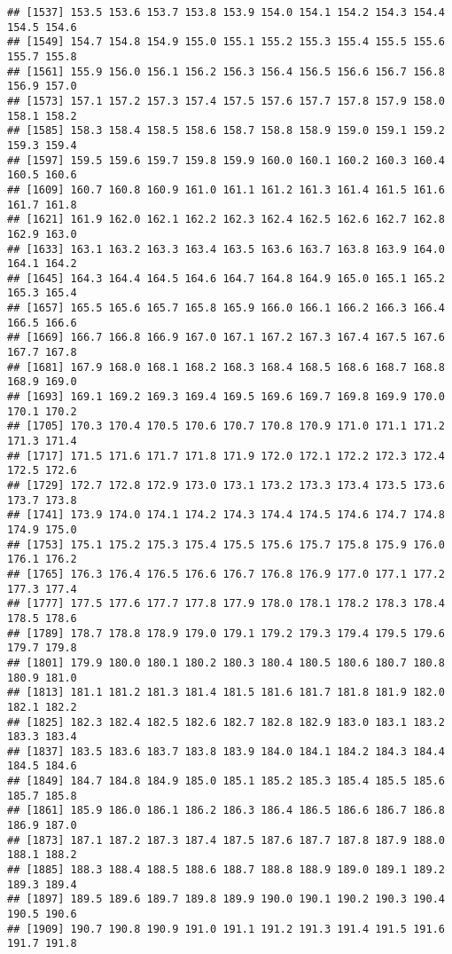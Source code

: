 \documentclass[
]{article}
\begin{document}
\begin{verbatim}
## [1537] 153.5 153.6 153.7 153.8 153.9 154.0 154.1 154.2 154.3 154.4 154.5 154.6
## [1549] 154.7 154.8 154.9 155.0 155.1 155.2 155.3 155.4 155.5 155.6 155.7 155.8
## [1561] 155.9 156.0 156.1 156.2 156.3 156.4 156.5 156.6 156.7 156.8 156.9 157.0
## [1573] 157.1 157.2 157.3 157.4 157.5 157.6 157.7 157.8 157.9 158.0 158.1 158.2
## [1585] 158.3 158.4 158.5 158.6 158.7 158.8 158.9 159.0 159.1 159.2 159.3 159.4
## [1597] 159.5 159.6 159.7 159.8 159.9 160.0 160.1 160.2 160.3 160.4 160.5 160.6
## [1609] 160.7 160.8 160.9 161.0 161.1 161.2 161.3 161.4 161.5 161.6 161.7 161.8
## [1621] 161.9 162.0 162.1 162.2 162.3 162.4 162.5 162.6 162.7 162.8 162.9 163.0
## [1633] 163.1 163.2 163.3 163.4 163.5 163.6 163.7 163.8 163.9 164.0 164.1 164.2
## [1645] 164.3 164.4 164.5 164.6 164.7 164.8 164.9 165.0 165.1 165.2 165.3 165.4
## [1657] 165.5 165.6 165.7 165.8 165.9 166.0 166.1 166.2 166.3 166.4 166.5 166.6
## [1669] 166.7 166.8 166.9 167.0 167.1 167.2 167.3 167.4 167.5 167.6 167.7 167.8
## [1681] 167.9 168.0 168.1 168.2 168.3 168.4 168.5 168.6 168.7 168.8 168.9 169.0
## [1693] 169.1 169.2 169.3 169.4 169.5 169.6 169.7 169.8 169.9 170.0 170.1 170.2
## [1705] 170.3 170.4 170.5 170.6 170.7 170.8 170.9 171.0 171.1 171.2 171.3 171.4
## [1717] 171.5 171.6 171.7 171.8 171.9 172.0 172.1 172.2 172.3 172.4 172.5 172.6
## [1729] 172.7 172.8 172.9 173.0 173.1 173.2 173.3 173.4 173.5 173.6 173.7 173.8
## [1741] 173.9 174.0 174.1 174.2 174.3 174.4 174.5 174.6 174.7 174.8 174.9 175.0
## [1753] 175.1 175.2 175.3 175.4 175.5 175.6 175.7 175.8 175.9 176.0 176.1 176.2
## [1765] 176.3 176.4 176.5 176.6 176.7 176.8 176.9 177.0 177.1 177.2 177.3 177.4
## [1777] 177.5 177.6 177.7 177.8 177.9 178.0 178.1 178.2 178.3 178.4 178.5 178.6
## [1789] 178.7 178.8 178.9 179.0 179.1 179.2 179.3 179.4 179.5 179.6 179.7 179.8
## [1801] 179.9 180.0 180.1 180.2 180.3 180.4 180.5 180.6 180.7 180.8 180.9 181.0
## [1813] 181.1 181.2 181.3 181.4 181.5 181.6 181.7 181.8 181.9 182.0 182.1 182.2
## [1825] 182.3 182.4 182.5 182.6 182.7 182.8 182.9 183.0 183.1 183.2 183.3 183.4
## [1837] 183.5 183.6 183.7 183.8 183.9 184.0 184.1 184.2 184.3 184.4 184.5 184.6
## [1849] 184.7 184.8 184.9 185.0 185.1 185.2 185.3 185.4 185.5 185.6 185.7 185.8
## [1861] 185.9 186.0 186.1 186.2 186.3 186.4 186.5 186.6 186.7 186.8 186.9 187.0
## [1873] 187.1 187.2 187.3 187.4 187.5 187.6 187.7 187.8 187.9 188.0 188.1 188.2
## [1885] 188.3 188.4 188.5 188.6 188.7 188.8 188.9 189.0 189.1 189.2 189.3 189.4
## [1897] 189.5 189.6 189.7 189.8 189.9 190.0 190.1 190.2 190.3 190.4 190.5 190.6
## [1909] 190.7 190.8 190.9 191.0 191.1 191.2 191.3 191.4 191.5 191.6 191.7 191.8

\end{verbatim}
\end{document}
